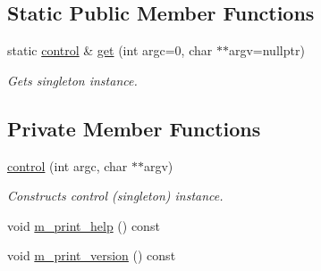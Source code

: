 \subsection*{Static Public Member Functions}
\begin{DoxyCompactItemize}
\item 
static \hyperlink{classjawe_1_1control}{control} \& \hyperlink{classjawe_1_1control_ad702fe6d2f641c518d12665278df20a3}{get} (int argc=0, char $\ast$$\ast$argv=nullptr)
\begin{DoxyCompactList}\small\item\em Gets singleton instance. \end{DoxyCompactList}\end{DoxyCompactItemize}
\subsection*{Private Member Functions}
\begin{DoxyCompactItemize}
\item 
\hyperlink{classjawe_1_1control_abaa77c23608e1eec0077bc9e4ae1554c}{control} (int argc, char $\ast$$\ast$argv)
\begin{DoxyCompactList}\small\item\em Constructs control (singleton) instance. \end{DoxyCompactList}\item 
void \hyperlink{classjawe_1_1control_ab5a7e27e96ce6489a1cd3f858ebee6c3}{m\+\_\+print\+\_\+help} () const
\item 
void \hyperlink{classjawe_1_1control_a6142361ac84b3a77c41b6137d8dfcc6f}{m\+\_\+print\+\_\+version} () const
\end{DoxyCompactItemize}
